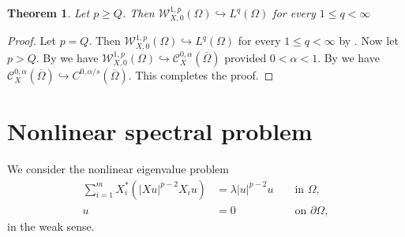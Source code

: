 \documentclass[a4paper,12pt,reqno]{amsart}
\numberwithin{equation}{section}
\theoremstyle{plain}
\newtheorem{theorem}{Theorem}[section]
\theoremstyle{definition}
\begin{document}
\begin{theorem}\label{continuous Sobolev embedding for p>Q}
Let $p\geq Q$. Then $\mathcal{W}_{X,0}^{1, p}(\Omega)\hookrightarrow L^{q}(\Omega)$   for every $1\leq q < \infty$  
\end{theorem}
\begin{proof}
Let $p=Q$. Then  $\mathcal{W}_{X,0}^{1, p}(\Omega)\hookrightarrow L^{q}(\Omega)$   for every $1\leq q < \infty$ by \cite[Remark 1.1]{chen2024sharp}. Now let $p>Q$. By \cite[Remark 1.1]{chen2024sharp} we have $\mathcal{W}_{X,0}^{1, p}(\Omega)\hookrightarrow \mathcal{C}^{0, \alpha}_{X}(\overline{\Omega})$ provided $0<\alpha<1$. By \cite[Proposition 2.14]{bramanti2023hormander} we have $\mathcal{C}^{0, \alpha}_{X}(\overline{\Omega})\hookrightarrow C^{0,\alpha/s}(\overline{\Omega})$. This completes the proof.
\end{proof}


\section{Nonlinear spectral problem}\label{sec3}
We consider the nonlinear eigenvalue problem
\begin{equation}\label{eigenvalue problem}
\begin{aligned}
\sum_{i=1}^{m}X_{i}^{*}\left(\left|X u\right|^{p-2} X_{i}u\right)&=\lambda|u|^{p-2} u  &&\text { in } \Omega, \\
u&=0
&&\text { on } \partial \Omega,
\end{aligned}
\end{equation}
in the weak  sense.
\end{document}

